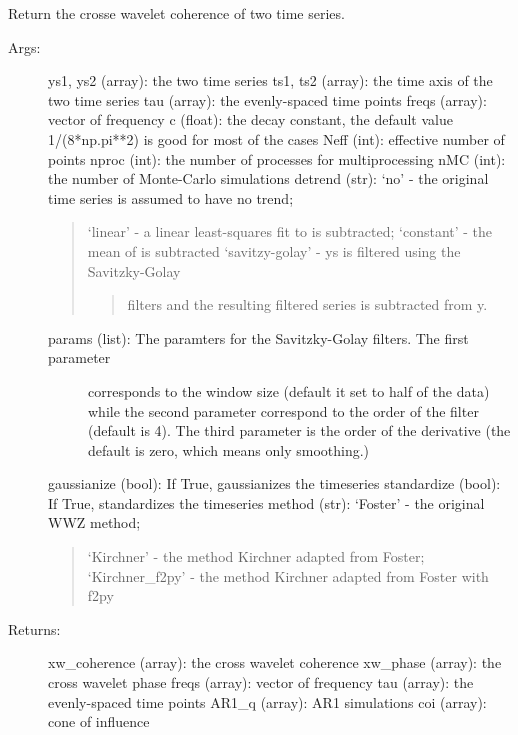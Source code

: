 \documentclass[letterpaper,10pt,english]{sphinxmanual}
\begin{document}

\begin{fulllineitems}
\label{\detokenize{Spectral:pyleoclim.Spectral.xwc}}
Return the crosse wavelet coherence of two time series.
\begin{description}
\item[{Args:}] \leavevmode
ys1, ys2 (array): the two time series
ts1, ts2 (array): the time axis of the two time series
tau (array): the evenly-spaced time points
freqs (array): vector of frequency
c (float): the decay constant, the default value 1/(8*np.pi**2) is good for most of the cases
Neff (int): effective number of points
nproc (int): the number of processes for multiprocessing
nMC (int): the number of Monte-Carlo simulations
detrend (str): ‘no’ - the original time series is assumed to have no trend;
\begin{quote}

‘linear’ - a linear least-squares fit to  is subtracted;
‘constant’ - the mean of  is subtracted
‘savitzy-golay’ - ys is filtered using the Savitzky-Golay
\begin{quote}

filters and the resulting filtered series is subtracted from y.
\end{quote}
\end{quote}
\begin{description}
\item[{params (list): The paramters for the Savitzky-Golay filters. The first parameter}] \leavevmode
corresponds to the window size (default it set to half of the data)
while the second parameter correspond to the order of the filter
(default is 4). The third parameter is the order of the derivative
(the default is zero, which means only smoothing.)

\end{description}

gaussianize (bool): If True, gaussianizes the timeseries
standardize (bool): If True, standardizes the timeseries
method (str): ‘Foster’ - the original WWZ method;
\begin{quote}

‘Kirchner’ - the method Kirchner adapted from Foster;
‘Kirchner\_f2py’ - the method Kirchner adapted from Foster with f2py
\end{quote}

\item[{Returns:}] \leavevmode
xw\_coherence (array): the cross wavelet coherence
xw\_phase (array): the cross wavelet phase
freqs (array): vector of frequency
tau (array): the evenly-spaced time points
AR1\_q (array): AR1 simulations
coi (array): cone of influence

\end{description}

\end{fulllineitems}
\end{document}
